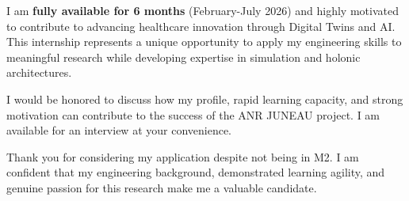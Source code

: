 \documentclass[11pt, a4paper]{awesome-cv}
\begin{document}
\begin{cvletter}

    I am \textbf{fully available for 6 months} (February-July 2026) and highly motivated to contribute to advancing healthcare innovation through Digital Twins and AI. This internship represents a unique opportunity to apply my engineering skills to meaningful research while developing expertise in simulation and holonic architectures.

    I would be honored to discuss how my profile, rapid learning capacity, and strong motivation can contribute to the success of the ANR JUNEAU project. I am available for an interview at your convenience.

    Thank you for considering my application despite not being in M2. I am confident that my engineering background, demonstrated learning agility, and genuine passion for this research make me a valuable candidate.

\end{cvletter}

\makeletterclosing
\end{document}
